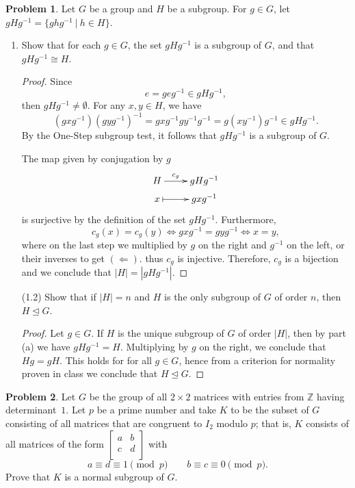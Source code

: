 \documentclass[11pt]{article}
\newcommand{\Z}{\mathbb{Z}}
\newcommand{\norm}{\trianglelefteq}
\theoremstyle{definition}
\newtheorem{problem}{Problem}
\begin{document}
\begin{problem} 
Let $G$ be a group and $H$ be a subgroup. For $g\in G$, let $gHg^{-1} = \{ ghg^{-1} \ | \ h\in H\}$.
\begin{enumerate}[(1.1)]
\item Show that for each $g\in G$, the set $gHg^{-1}$ is a subgroup of $G$, and that $gHg^{-1} \cong H$.

\begin{proof}
Since 
$$e=geg^{-1}\in gHg^{-1},$$ 
then $gHg^{-1}\neq \emptyset$. For any $x,y\in H$, we have
$$(gxg^{-1})(gyg^{-1})^{-1}=gxg^{-1}gy^{-1}g^{-1}=g(xy^{-1})g^{-1} \in gHg^{-1}.$$
By the One-Step subgroup test, it follows that $gHg^{-1}$ is a subgroup of $G$.

The map given by conjugation by $g$
$$\xymatrix@R=1mm{H \ar[r]^-{c_g} & gHg^{-1} \\ x \ar@{|->}[r] & gxg^{-1}}$$
is surjective by the definition of the set $gHg^{-1}$.
Furthermore, 
$$c_g(x)=c_g(y) \iff gxg^{-1}=gyg^{-1} \iff x=y,$$ 
where on the last step we multiplied by $g$ on the right and $g^{-1}$ on the left, or their inverses to get $(\Leftarrow)$.
thus $c_g$ is  injective. Therefore, $c_g$ is a bijection and we conclude that $|H|=|gHg^{-1}|$.
\end{proof}

\item[(1.2)] Show that if $|H|=n$ and $H$ is the only subgroup of $G$ of order $n$, then $H\trianglelefteq G$.

\begin{proof}
Let $g \in G$. 
If  $H$ is the unique subgroup of $G$ of order $|H|$, then by part (a) we have $gHg^{-1} = H$. Multiplying by $g$ on the right, we conclude that $Hg=gH$. This holds for for all $g\in G$, hence from a criterion for normality proven in class we conclude that $H\norm G$.
\end{proof}

\end{enumerate}
\end{problem} 

\smallskip

\begin{problem}
 Let $G$ be the group of all $2 \times 2$ matrices with entries from $\Z$ having determinant~$1$. Let $p$ be a prime number and take $K$ to be the subset of $G$ consisting
      of all matrices that are congruent to $I_2$ modulo $p$; that is, $K$ consists of all matrices
      of the form $\begin{bmatrix} a & b \\ c & d \\ \end{bmatrix}$ with \[a \equiv d \equiv 1 \pmod{p} \qquad b \equiv c \equiv 0 \pmod{p}.\]  Prove that
      $K$ is a normal subgroup of $G$.
      \end{problem}
      
\end{document}
